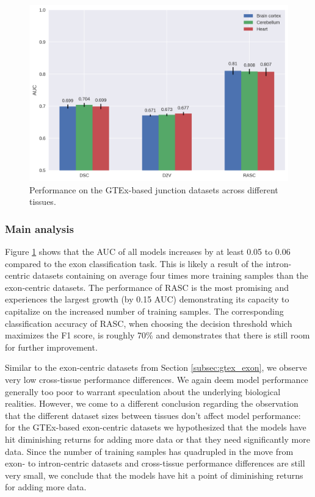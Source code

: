 \begin{figure}[h]
	\centering\includegraphics[width=1\textwidth]{../visualizations/ch5-results/gtex_junc_barcharts.png} 
	\caption{Performance on the GTEx-based junction datasets across different tissues. }
	\label{fig:gtex_junc_barcharts}

\end{figure}


\subsubsection{Main analysis}
Figure \ref{fig:gtex_junc_barcharts} shows that the AUC of all models increases by at least 0.05 to 0.06 compared to the exon classification task. This is likely a result of the intron-centric datasets containing on average four times more training samples than the exon-centric datasets. The performance of RASC is the most promising and experiences the largest growth (by 0.15 AUC) demonstrating its capacity to capitalize on the increased number of training samples. The corresponding classification accuracy of RASC, when choosing the decision threshold which maximizes the F1 score, is roughly 70\% and demonstrates that there is still room for further improvement. 

Similar to the exon-centric datasets from Section \ref{subsec:gtex_exon}, we observe very low cross-tissue performance differences. We again deem model performance generally too poor to warrant speculation about the underlying biological realities. However, we come to a different conclusion regarding the observation that the different dataset sizes between tissues don't affect model performance:
for the GTEx-based exon-centric datasets we hypothesized that the models have hit diminishing returns for adding more data or that they need significantly more data. Since the number of training samples has quadrupled in the move from exon- to intron-centric datasets and cross-tissue performance differences are still very small, we conclude that the models have hit a point of diminishing returns for adding more data. 

